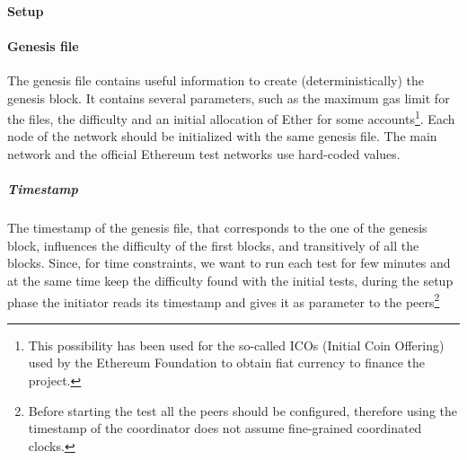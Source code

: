 \paragraph{Setup}

\paragraph{Genesis file}

The genesis file contains useful information to create (deterministically)
the genesis block. It contains several parameters, such as the maximum
gas limit for the files, the difficulty and an initial allocation of Ether
for some accounts\footnote{This possibility has been used for the so-called
ICOs (Initial Coin Offering) used by the Ethereum Foundation to obtain fiat
currency to finance the project.}. Each node of the network should be 
initialized with the same genesis file. 
The main network and the official Ethereum test
networks use hard-coded values.



\subparagraph{Timestamp}
The timestamp of the genesis file, that corresponds to the one of the genesis
block, influences the difficulty of the first blocks, and transitively
of all the blocks.
Since, for time constraints, we want to run each test for few minutes and
at the same time keep the difficulty found with the initial tests,
during the setup phase the initiator reads its timestamp and gives it
as parameter to the peers\footnote{Before starting the test all the
peers should be configured, therefore using the timestamp of the coordinator
does not assume fine-grained coordinated clocks.}


